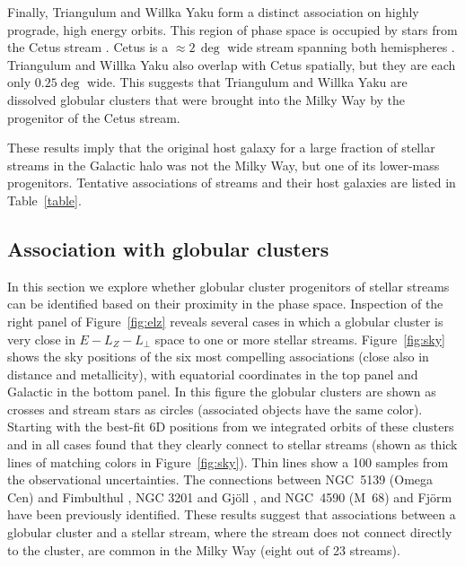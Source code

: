 \documentclass[twocolumn]{aastex63}
\begin{document}
Finally, Triangulum and Willka Yaku form a distinct association on highly prograde, high energy orbits.
This region of phase space is occupied by stars from the Cetus stream \citep{yuan2019}.
Cetus is a $\approx2\,\deg$ wide stream spanning both hemispheres \citep[the southern portion of the stream was identified as the Palca overdensity]{newberg2009, chang2020}.
Triangulum and Willka Yaku also overlap with Cetus spatially, but they are each only $0.25\deg$ wide.
This suggests that Triangulum and Willka Yaku are dissolved globular clusters that were brought into the Milky Way by the progenitor of the Cetus stream.

These results imply that the original host galaxy for a large fraction of stellar streams in the Galactic halo was not the Milky Way, but one of its lower-mass progenitors.
Tentative associations of streams and their host galaxies are listed in Table~\ref{table}.


\subsection{Association with globular clusters}
\label{sec:progenitors}
In this section we explore whether globular cluster progenitors of stellar streams can be identified based on their proximity in the phase space.
Inspection of the right panel of Figure~\ref{fig:elz} reveals several cases in which a globular cluster is very close in $E-L_Z-L_\perp$ space to one or more stellar streams.
Figure~\ref{fig:sky} shows the sky positions of the six most compelling associations (close also in distance and metallicity), with equatorial coordinates in the top panel and Galactic in the bottom panel.
In this figure the globular clusters are shown as crosses and stream stars as circles (associated objects have the same color).
Starting with the best-fit 6D positions from \citet{baumgardt2019} we integrated orbits of these clusters and in all cases found that they clearly connect to stellar streams (shown as thick lines of matching colors in Figure~\ref{fig:sky}).
Thin lines show a 100 samples from the observational uncertainties.
The connections between NGC~5139 (Omega Cen) and Fimbulthul \citep{ibata2019b}, NGC 3201 and Gj\" oll \citep{hansen2020}, and NGC~4590 (M~68) and Fj\" orm \citep{palau2019} have been previously identified.
These results suggest that associations between a globular cluster and a stellar stream, where the stream does not connect directly to the cluster, are common in the Milky Way (eight out of 23 streams).
\end{document}
